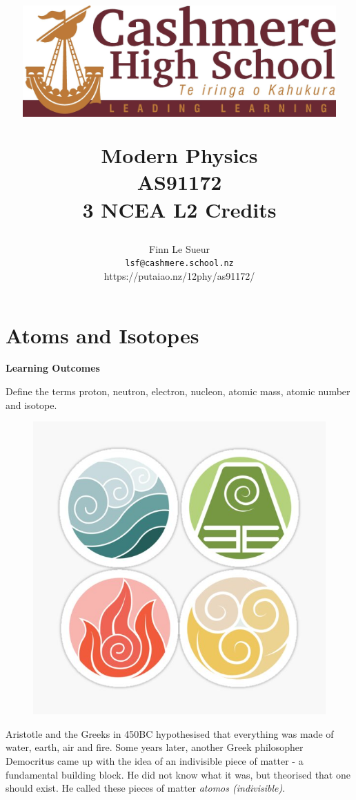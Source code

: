 \documentclass[12pt]{report}
\title{
	\centerline{\includegraphics[width=120mm]{assets/lymphad.jpg}}
	\vspace{2cm}
	\Huge{Modern Physics}\\
	\large{AS91172 \\ 3 NCEA L2 Credits}
}
\author{Finn Le Sueur \\ \texttt{lsf@cashmere.school.nz} \\ https://putaiao.nz/12phy/as91172/}
\date{
	\vspace{2cm}
	\the\year{}
	\vspace{2cm}
}
\begin{document}
\maketitle

\newpage

\setcounter{tocdepth}{1}
\tableofcontents

\newpage
\chapter{Atoms and Isotopes}

\noindent\textbf{Learning Outcomes}
\begin{nwa}
	\item Define the terms proton, neutron, electron, nucleon, atomic mass, atomic number and isotope.
\end{nwa}

\begin{figure}
	\vspace{-1cm}
	\begin{center}
		\includegraphics[width=0.9\linewidth]{four-nations.jpg}
	\end{center}
\end{figure}

Aristotle and the Greeks in 450BC hypothesised that everything was made of water, earth, air and fire. Some years later, another Greek philosopher Democritus came up with the idea of an indivisible piece of matter - a fundamental building block. He did not know what it was, but theorised that one should exist. He called these pieces of matter \textit{atomos (indivisible)}.
\end{document}
